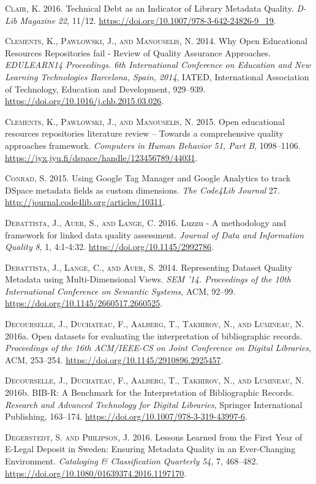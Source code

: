\textsc{Clair, K.} 2016. Technical Debt as an Indicator of Library Metadata Quality. \emph{D-Lib Magazine} \emph{22}, 11/12. \url{https://doi.org/10.1007/978-3-642-24826-9_19}.

\textsc{Clements, K., Pawlowski, J., and Manouselis, N.} 2014. Why Open Educational Resources Repositories fail - Review of Quality Assurance Approaches. \emph{EDULEARN14 Proceedings. 6th International Conference on Education and New Learning Technologies Barcelona, Spain, 2014}, IATED, International Association of Technology, Education and Development, 929–939. \url{https://doi.org/10.1016/j.chb.2015.03.026}.

\textsc{Clements, K., Pawlowski, J., and Manouselis, N.} 2015. Open educational resources repositories literature review – Towards a comprehensive quality approaches framework. \emph{Computers in Human Behavior} \emph{51, Part B}, 1098–1106. \url{https://jyx.jyu.fi/dspace/handle/123456789/44031}.

\textsc{Conrad, S.} 2015. Using Google Tag Manager and Google Analytics to track DSpace metadata fields as custom dimensions. \emph{The Code4Lib Journal} 27. \url{http://journal.code4lib.org/articles/10311}.

\textsc{Debattista, J., Auer, S., and Lange, C.} 2016. Luzzu - A methodology and framework for linked data quality assessment. \emph{Journal of Data and Information Quality} \emph{8}, 1, 4:1-4:32. \url{https://doi.org/10.1145/2992786}.

\textsc{Debattista, J., Lange, C., and Auer, S.} 2014. Representing Dataset Quality Metadata using Multi-Dimensional Views. \emph{SEM ’14. Proceedings of the 10th International Conference on Semantic Systems}, ACM, 92–99. \url{https://doi.org/10.1145/2660517.2660525}.

\textsc{Decourselle, J., Duchateau, F., Aalberg, T., Takhirov, N., and Lumineau, N.} 2016a. Open datasets for evaluating the interpretation of bibliographic records. \emph{Proceedings of the 16th ACM/IEEE-CS on Joint Conference on Digital Libraries}, ACM, 253–254. \url{https://doi.org/10.1145/2910896.2925457}.

\textsc{Decourselle, J., Duchateau, F., Aalberg, T., Takhirov, N., and Lumineau, N.} 2016b. BIB-R: A Benchmark for the Interpretation of Bibliographic Records. \emph{Research and Advanced Technology for Digital Libraries}, Springer International Publishing, 163–174. \url{https://doi.org/10.1007/978-3-319-43997-6}.

\textsc{Degerstedt, S. and Philipson, J.} 2016. Lessons Learned from the First Year of E-Legal Deposit in Sweden: Ensuring Metadata Quality in an Ever-Changing Environment. \emph{Cataloging \& Classification Quarterly} \emph{54}, 7, 468–482. \url{https://doi.org/10.1080/01639374.2016.1197170}.

